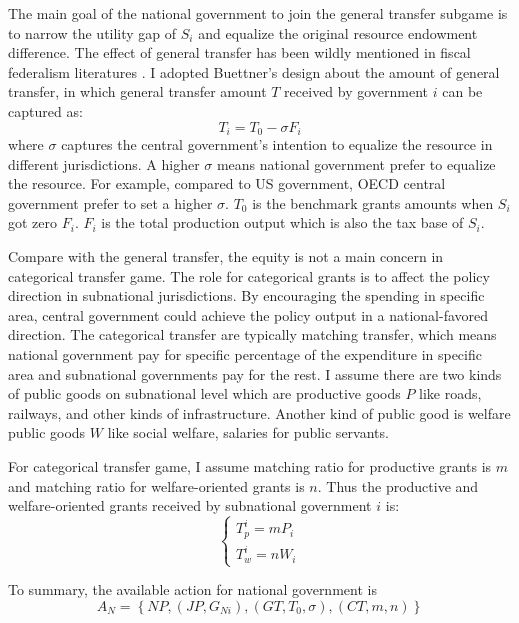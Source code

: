\begin{itemize}
The main goal of the national government to join the general transfer subgame is to narrow the utility gap of $S_i$ and equalize the original resource endowment difference. The effect of general transfer has been wildly mentioned in fiscal federalism literatures \cite{buettner2006incentive,lv2018transfer}. I adopted Buettner's design about the amount of general transfer, in which general transfer amount $T$ received by government $i$ can be captured as:
$$T_i = T_0 - \sigma F_i $$ \label{generaltransfer}
where $\sigma$ captures the central government's intention to equalize the resource in different jurisdictions. A higher $\sigma$ means national government prefer to equalize the resource. For example, compared to US government, OECD central government prefer to set a higher $\sigma$. $T_0$ is the benchmark grants amounts when $S_i$ got zero $F_i$. $F_i$ is the total production output which is also the tax base of $S_i$.

Compare with the general transfer, the equity is not a main concern in categorical transfer game. The role for categorical grants is to affect the policy direction in subnational jurisdictions. By encouraging the spending in specific area, central government could achieve the policy output in a national-favored direction. The categorical transfer are typically matching transfer, which means national government pay for specific percentage of the expenditure in specific area and subnational governments pay for the rest. I assume there are two kinds of public goods on subnational level which are productive goods $P$ like roads, railways, and other kinds of infrastructure. Another kind of public good is welfare public goods $W$ like social welfare, salaries for public servants.

For categorical transfer game, I assume matching ratio for productive grants is $m$ and matching ratio for welfare-oriented grants is $n$. Thus the productive and welfare-oriented grants received by subnational government $i$ is:
$$
    \left\{\begin{array}{l}
        T_p^i=m P_i \\
        T_w^i=n W_i
    \end{array}\right.
$$
\label{mrmatrix}

To summary, the available action for national government is $$A_N=\left\{N P,\left(J P, G_{Ni}\right),\left(G T, T_0, \sigma\right),(C T, m,n)\right\} $$

\newpage



\end{itemize}
